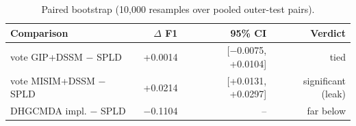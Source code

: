 \begin{table}[t]
\centering
\small
\caption{Paired bootstrap (10,000 resamples over pooled outer-test pairs).}
\label{tab:boot}
\begin{tabular}{@{}lrrr@{}}
\toprule
Comparison & $\Delta$ F1 & 95\% CI & Verdict \\
\midrule
vote GIP+DSSM $-$ SPLD & +0.0014 & [$-$0.0075, +0.0104] & tied \\
vote MISIM+DSSM $-$ SPLD & +0.0214 & [+0.0131, +0.0297] & significant (leak) \\
DHGCMDA impl. $-$ SPLD & $-$0.1104 & -- & far below \\
\bottomrule
\end{tabular}
\end{table}
